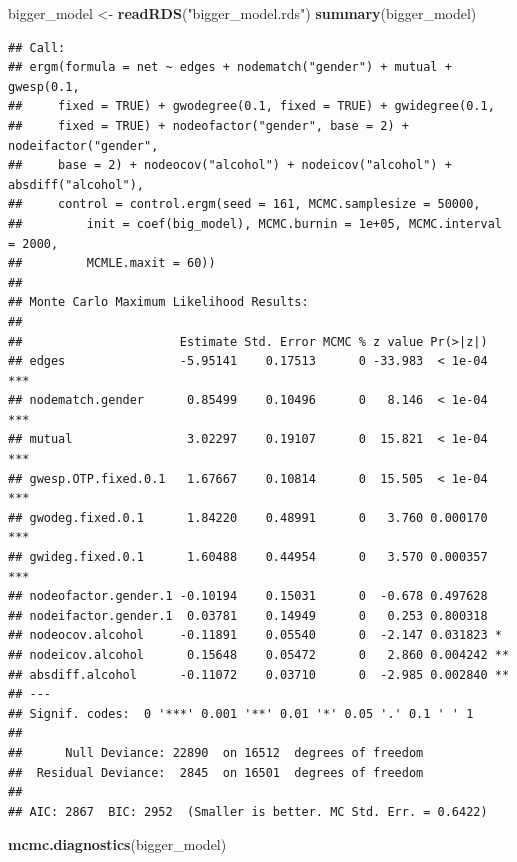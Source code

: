 \documentclass[
]{article}
\newenvironment{Shaded}{\begin{snugshade}}{\end{snugshade}}
\newcommand{\FunctionTok}[1]{\textcolor[rgb]{0.13,0.29,0.53}{\textbf{#1}}}
\newcommand{\NormalTok}[1]{#1}
\newcommand{\OtherTok}[1]{\textcolor[rgb]{0.56,0.35,0.01}{#1}}
\newcommand{\StringTok}[1]{\textcolor[rgb]{0.31,0.60,0.02}{#1}}
\begin{document}
\begin{Shaded}
\begin{Highlighting}[]
\NormalTok{bigger\_model }\OtherTok{\textless{}{-}} \FunctionTok{readRDS}\NormalTok{(}\StringTok{"bigger\_model.rds"}\NormalTok{)}
\FunctionTok{summary}\NormalTok{(bigger\_model)}
\end{Highlighting}
\end{Shaded}

\begin{verbatim}
## Call:
## ergm(formula = net ~ edges + nodematch("gender") + mutual + gwesp(0.1, 
##     fixed = TRUE) + gwodegree(0.1, fixed = TRUE) + gwidegree(0.1, 
##     fixed = TRUE) + nodeofactor("gender", base = 2) + nodeifactor("gender", 
##     base = 2) + nodeocov("alcohol") + nodeicov("alcohol") + absdiff("alcohol"), 
##     control = control.ergm(seed = 161, MCMC.samplesize = 50000, 
##         init = coef(big_model), MCMC.burnin = 1e+05, MCMC.interval = 2000, 
##         MCMLE.maxit = 60))
## 
## Monte Carlo Maximum Likelihood Results:
## 
##                      Estimate Std. Error MCMC % z value Pr(>|z|)    
## edges                -5.95141    0.17513      0 -33.983  < 1e-04 ***
## nodematch.gender      0.85499    0.10496      0   8.146  < 1e-04 ***
## mutual                3.02297    0.19107      0  15.821  < 1e-04 ***
## gwesp.OTP.fixed.0.1   1.67667    0.10814      0  15.505  < 1e-04 ***
## gwodeg.fixed.0.1      1.84220    0.48991      0   3.760 0.000170 ***
## gwideg.fixed.0.1      1.60488    0.44954      0   3.570 0.000357 ***
## nodeofactor.gender.1 -0.10194    0.15031      0  -0.678 0.497628    
## nodeifactor.gender.1  0.03781    0.14949      0   0.253 0.800318    
## nodeocov.alcohol     -0.11891    0.05540      0  -2.147 0.031823 *  
## nodeicov.alcohol      0.15648    0.05472      0   2.860 0.004242 ** 
## absdiff.alcohol      -0.11072    0.03710      0  -2.985 0.002840 ** 
## ---
## Signif. codes:  0 '***' 0.001 '**' 0.01 '*' 0.05 '.' 0.1 ' ' 1
## 
##      Null Deviance: 22890  on 16512  degrees of freedom
##  Residual Deviance:  2845  on 16501  degrees of freedom
##  
## AIC: 2867  BIC: 2952  (Smaller is better. MC Std. Err. = 0.6422)
\end{verbatim}

\begin{Shaded}
\begin{Highlighting}[]
\FunctionTok{mcmc.diagnostics}\NormalTok{(bigger\_model)}
\end{Highlighting}
\end{Shaded}
\end{document}
